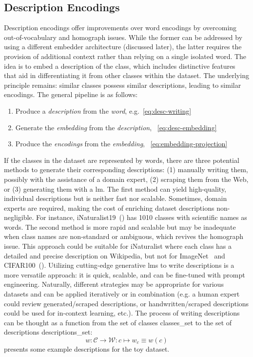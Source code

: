 \subsection{Description Encodings}
\label{subsec:description-encodings}

Description encodings offer improvements over word encodings by overcoming out-of-vocabulary and homograph issues. While the former can be addressed by using a different embedder architecture (discussed later), the latter requires the provision of additional context rather than relying on a single isolated word. 
The idea is to embed a description of the class, which includes distinctive features that aid in differentiating it from other classes within the dataset. The underlying principle remains: similar classes possess similar descriptions, leading to similar encodings.
The general pipeline is as follows:
\begin{enumerate}
  \item Produce a \emph{description} from the \emph{word}, e.g.~\eqref{eq:desc-writing}
  \item Generate the \emph{embedding} from the \emph{description}, ~\eqref{eq:desc-embedding}
  \item Produce the \emph{encodings} from the \emph{embedding}, ~\eqref{eq:embedding-projection}
\end{enumerate}

If the classes in the dataset are represented by words, there are three potential methods to generate their corresponding descriptions: (1) manually writing them, possibly with the assistance of a domain expert, (2) scraping them from the Web, or (3) generating them with a \acrshort{lm}.
The first method can yield high-quality, individual descriptions but is neither fast nor scalable. Sometimes, domain experts are required, making the cost of enriching dataset descriptions non-negligible. For instance, iNaturalist19~() has 1010 classes with scientific names as words.
The second method is more rapid and scalable but may be inadequate when class names are non-standard or ambiguous, which revives the homograph issue. This approach could be suitable for iNaturalist where each class has a detailed and precise description on Wikipedia, but not for ImageNet~\cite{ImagenetALarDeng2009} and CIFAR100~().
Utilizing cutting-edge generative \acrshort{lm}s to write descriptions is a more versatile approach: it is quick, scalable, and can be fine-tuned with prompt engineering.
Naturally, different strategies may be appropriate for various datasets and can be applied iteratively or in combination (e.g. a human expert could review generated/scraped descriptions, or handwritten/scraped descriptions could be used for in-context learning, etc.).
The process of writing descriptions can be thought as a function from the set of classes \gls{classes_set} to the set of descriptions \gls{descriptions_set}:
\begin{equation}
  w : \mathcal{C} \to \mathcal{W}:
  c \mapsto w_c \equiv w(c)
  \label{eq:desc-writing}
\end{equation}
 presents some example descriptions for the toy dataset.

